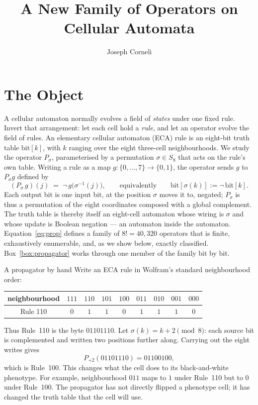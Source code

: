 \documentclass[man,12pt,floatsintext]{apa7}
\title{A New Family of Operators on Cellular Automata}
\author{Joseph Corneli}
\affiliation{}
\newcommand{\sig}{\sigma}
\newcommand{\bit}[1]{\mathrm{bit}[#1]}
\begin{document}
\maketitle

\section{The Object}
\label{sec:object}

A cellular automaton normally evolves a field of \emph{states} under one
fixed rule. Invert that arrangement: let each cell hold a \emph{rule}, and
let an operator evolve the field of rules. An elementary cellular automaton
(ECA) rule is an eight-bit truth table $\bit{k}$, with $k$ ranging over the
eight three-cell neighbourhoods. We study the operator $P_\sig$, parameterised by a
permutation $\sig \in S_8$ that acts on the rule's own table. Writing a rule
as a map $g\colon \{0,\dots,7\} \to \{0,1\}$, the operator sends $g$ to
$P_\sig g$ defined by
\begin{equation}
(P_\sig\, g)(j) \;=\; \lnot\, g\bigl(\sig^{-1}(j)\bigr),
\qquad\text{equivalently}\qquad \bit{\sig(k)} := \lnot\,\bit{k}.
\label{eq:prop}
\end{equation}
Each output bit is one input bit, at the position $\sig$ moves it to, negated;
$P_\sig$ is thus a permutation of the eight coordinates composed with a global
complement. The truth table is thereby itself an eight-cell automaton whose
wiring is $\sig$ and whose update is Boolean negation --- an automaton inside
the automaton. Equation~\eqref{eq:prop} defines a family of $8! = 40{,}320$
operators that is finite, exhaustively enumerable, and, as we show below,
exactly classified. Box~\ref{box:propagator} works through one member of the
family bit by bit.

\begin{workedexample}[label={box:propagator}]{A propagator by hand}
\small
Write an ECA rule in Wolfram's standard neighbourhood order:
\begin{center}
\setlength{\tabcolsep}{3.2pt}
\begin{tabular}{c@{\quad}*{8}{c}}
neighbourhood & $111$ & $110$ & $101$ & $100$ & $011$ & $010$ & $001$ & $000$ \\
\midrule
Rule 110 & $0$ & $1$ & $1$ & $0$ & $1$ & $1$ & $1$ & $0$ \\
\end{tabular}
\end{center}
Thus Rule~110 is the byte $01101110$. Let $\sig(k)=k+2\pmod 8$:
each source bit is complemented and written two positions further along.
Carrying out the eight writes gives
\[
P_{+2}(01101110)=01100100,
\]
which is Rule~100. This changes what the cell does to its black-and-white
phenotype. For example, neighbourhood $011$ maps to $1$ under Rule~110 but
to $0$ under Rule~100. The propagator has not directly flipped a phenotype
cell; it has changed the truth table that the cell will use.
\end{workedexample}
\end{document}
